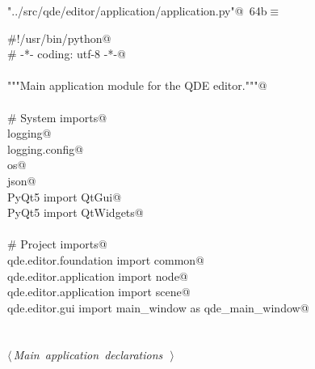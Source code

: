 \documentclass[
    a4paper,      %
    10pt,         %
    openright,    %
    notitlepage,  %
    parskip=half, %
]{scrreprt}       %
\theoremstyle{definition}                    %
\begin{document}
\begin{flushleft} \small
\begin{minipage}{\linewidth}\label{scrap108}\raggedright\small
{} \verb@"../src/qde/editor/application/application.py"@\nobreak\ {\footnotesize {64b}}$\equiv$
\vspace{-1ex}
\begin{list}{}{} \item
\mbox{}\lstinline@#!/usr/bin/python@\\
\mbox{}\lstinline@# -*- coding: utf-8 -*-@\\
\mbox{}\lstinline@@\\
\mbox{}\lstinline@"""Main application module for the QDE editor."""@\\
\mbox{}\lstinline@@\\
\mbox{}\lstinline@# System imports@\\
\mbox{}\lstinline@import logging@\\
\mbox{}\lstinline@import logging.config@\\
\mbox{}\lstinline@import os@\\
\mbox{}\lstinline@import json@\\
\mbox{}\lstinline@from PyQt5 import QtGui@\\
\mbox{}\lstinline@from PyQt5 import QtWidgets@\\
\mbox{}\lstinline@@\\
\mbox{}\lstinline@# Project imports@\\
\mbox{}\lstinline@from qde.editor.foundation import common@\\
\mbox{}\lstinline@from qde.editor.application import node@\\
\mbox{}\lstinline@from qde.editor.application import scene@\\
\mbox{}\lstinline@from qde.editor.gui import main_window as qde_main_window@\\
\mbox{}\lstinline@@\\
\mbox{}\lstinline@@\\
\mbox{}\lstinline@@\hbox{$\langle\,${\itshape Main application declarations}\nobreak\ {\footnotesize {}}$\,\rangle$}\lstinline@@\\
\mbox{}\lstinline@@{\NWsep}
\end{list}
\vspace{-1.5ex}
\footnotesize
\begin{list}{}{\setlength{\itemsep}{-\parsep}\setlength{\itemindent}{-\leftmargin}}

\item{}
\end{list}
\end{minipage}\vspace{4ex}
\end{flushleft}
\end{document}
